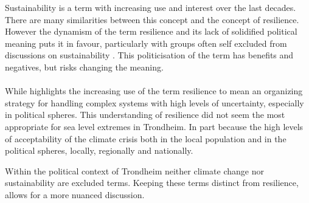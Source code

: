Sustainability is a term with increasing use and interest over the last decades. There are many similarities between this concept and the concept of resilience. However the dynamism of the term resilience and its lack of solidified political meaning puts it in favour, particularly with groups often self excluded from discussions on sustainability \cite{moser_turbulent_2019}. This politicisation of the term has benefits and negatives, but risks changing the meaning.
\paragraph{}

While \cite{moser_turbulent_2019} highlights the increasing use of the term resilience to mean an organizing strategy for handling complex systems with high levels of uncertainty, especially in political spheres. This understanding of resilience did not seem the most appropriate for sea level extremes in Trondheim. In part because the high levels of acceptability of the climate crisis both in the local population and in the political spheres, locally, regionally and nationally. 

Within the political context of Trondheim neither climate change nor sustainability are excluded terms. Keeping these terms distinct from resilience, allows for a more nuanced discussion.








